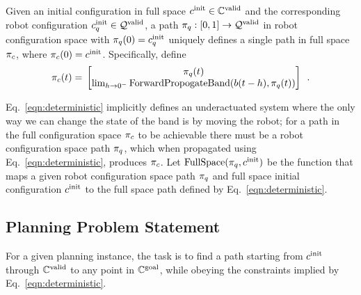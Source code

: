 \begin{assumption}
\label{ass:deterministic}
    Given an initial configuration in full space $c^\textrm{init} \in \mathbb{C}^\textrm{valid}$ and the corresponding robot configuration $c^\textrm{init}_q \in \mathcal{Q}^{\textrm{valid}}$, a path $\pi_{q} : [0, 1] \rightarrow \mathcal{Q}^{\textrm{valid}}$ in robot configuration space with $\pi_{q}(0) = c^\textrm{init}_q$ uniquely defines a single path in full space $\pi_{c}$, where $\pi_{c}(0) = c^\textrm{init}$.  Specifically, define
    \begin{equation}
        \pi_{c}(t) =\\ \begin{bmatrix} \pi_{q}(t) \\ \lim_{h \rightarrow 0^-} \textup{ForwardPropogateBand}(b(t-h), \pi_{q}(t)) \end{bmatrix} \enspace .
        \label{eqn:deterministic}
    \end{equation}
\end{assumption}

Eq.~\eqref{eqn:deterministic} implicitly defines an underactuated system where the only way we can change the state of the band is by moving the robot; for a path in the full configuration space $\pi_{c}$ to be achievable there must be a robot configuration space path $\pi_{q}$, which when propagated using Eq.~\eqref{eqn:deterministic}, produces $\pi_{c}$. Let $\textrm{FullSpace}(\pi_{q}, c^\textrm{init})$ be the function that maps a given robot configuration space path $\pi_{q}$ and full space initial configuration $c^\textrm{init}$ to the full space path defined by Eq.~\eqref{eqn:deterministic}.




\subsection{Planning Problem Statement}

For a given planning instance, the task is to find a path starting from $c^\textrm{init}$ through $\mathbb{C}^\textrm{valid}$ to any point in $\mathbb{C}^\textrm{goal}$, while obeying the constraints implied by Eq.~\eqref{eqn:deterministic}.

